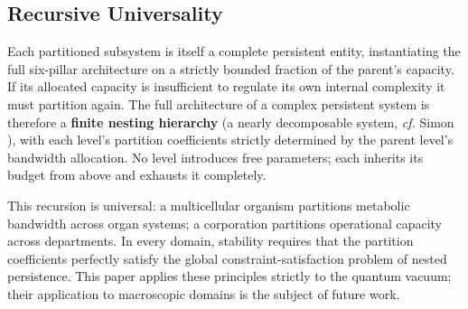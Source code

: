 \subsection{Recursive Universality}
Each partitioned subsystem is itself a complete persistent entity, instantiating the full six-pillar architecture on a strictly bounded fraction of the parent's capacity. If its allocated capacity is insufficient to regulate its own internal complexity it must partition again. The full architecture of a complex persistent system is therefore a \textbf{finite nesting hierarchy} (a nearly decomposable system, \textit{cf.} Simon \cite{klir_architecture_1991}), with each level's partition coefficients strictly determined by the parent level's bandwidth allocation. No level introduces free parameters; each inherits its budget from above and exhausts it completely.

This recursion is universal: a multicellular organism partitions metabolic bandwidth across organ systems; a corporation partitions operational capacity across departments. In every domain, stability requires that the partition coefficients perfectly satisfy the global constraint-satisfaction problem of nested persistence. This paper applies these principles strictly to the quantum vacuum; their application to macroscopic domains is the subject of future work.